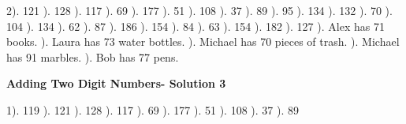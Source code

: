 \documentclass{article}%
\begin{document}
2). 121%
). 128%
). 117%
). 69%
). 177%
). 51%
). 108%
). 37%
). 89%
). 95%
). 134%
). 132%
). 70%
). 104%
). 134%
). 62%
). 87%
). 186%
). 154%
). 84%
). 63%
). 154%
). 182%
). 127%
). Alex has 71 books.%
). Laura has 73 water bottles.%
). Michael has 70 pieces of trash.%
). Michael has 91 marbles.%
). Bob has 77 pens.%
\newline%
\newpage%
\large%
\begin{center}%
\textbf{Adding Two Digit Numbers- Solution 3}%
\newline%
\end{center} \normalsize%
1). 119%
). 121%
). 128%
). 117%
). 69%
). 177%
). 51%
). 108%
). 37%
). 89%
\newline%
\end{document}
